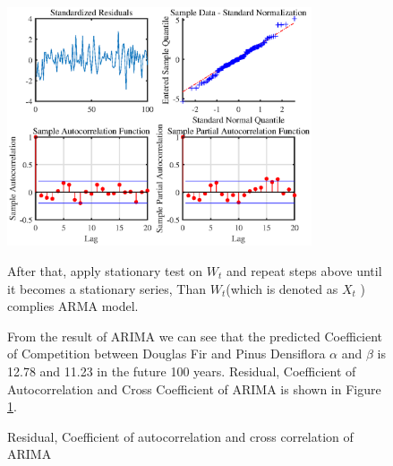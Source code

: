 \documentclass{mcmthesis}
\numberwithin{figure}{section}
\numberwithin{table}{section}
\numberwithin{equation}{section}
\begin{document}
\begin{figure}[ht]

  \hfill
  \begin{minipage}[htbp]{0.63\linewidth}
    \begin{flushleft}
      \includegraphics[width = 9cm]{code&pic/ARIMA残差&自相关互相关系数.eps}
      \caption{Residual, Coefficient of autocorrelation and cross correlation of ARIMA}\label{ARIMA Res}
    \end{flushleft}
  \end{minipage}
    \begin{minipage}[htbp]{0.34\linewidth}
      After that, apply stationary test on $ W_t $ and repeat steps above 
      until it becomes a stationary series, Than $ W_t $(which is denoted
      as $ X_t $ ) complies ARMA model. 
      \par
      From the result of ARIMA we can see that the predicted Coefficient of Competition
      between  Douglas Fir and Pinus Densiflora $ \alpha  $ and $ \beta $ is 12.78 and 11.23
      in the future 100 years. Residual, Coefficient of Autocorrelation and Cross Coefficient
      of ARIMA is shown in Figure \ref{ARIMA Res}.
  \end{minipage}
\end{figure}



\end{document}
